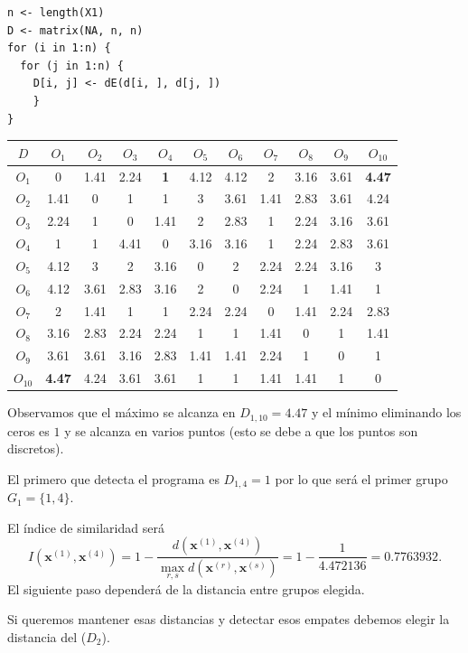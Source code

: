 \begin{lstlisting}
n <- length(X1)
D <- matrix(NA, n, n)
for (i in 1:n) {
  for (j in 1:n) {
    D[i, j] <- dE(d[i, ], d[j, ])
    } 
}
\end{lstlisting}
\begin{center}
\begin{tabular}{c|cccccccccc}
$D$ & $O_{1}$ & $O_2$ & $O_3$ & $O_4$ & $O_5$ & $O_6$ & $O_7$ & $O_8$ & $O_9$ & $O_{10}$ \\ \hline
$O_1$ & 0 & 1.41 & 2.24 & \textbf{1} & 4.12 & 4.12 & 2 & 3.16 & 3.61 & \textbf{4.47} \\
$O_2$ & 1.41 & 0 & 1 & 1 & 3 & 3.61 & 1.41 & 2.83 & 3.61 & 4.24 \\
$O_3$ & 2.24 & 1 & 0 & 1.41 & 2 & 2.83 & 1 & 2.24 & 3.16 & 3.61 \\
$O_4$ & 1 & 1 & 4.41 & 0 & 3.16 & 3.16 & 1 & 2.24 & 2.83 & 3.61 \\
$O_5$ & 4.12 & 3 & 2 & 3.16 & 0 & 2 & 2.24 & 2.24 & 3.16 & 3 \\
$O_6$ & 4.12 & 3.61 & 2.83 & 3.16 & 2 & 0 & 2.24 & 1 & 1.41 & 1 \\
$O_7$ & 2 & 1.41 & 1 & 1 & 2.24 & 2.24 & 0 & 1.41 & 2.24 & 2.83 \\
$O_8$ & 3.16 & 2.83 & 2.24 & 2.24 & 1 & 1 & 1.41 & 0 & 1 & 1.41 \\
$O_9$ & 3.61 & 3.61 & 3.16 & 2.83 & 1.41 & 1.41 & 2.24 & 1 & 0 & 1 \\
$O_{10}$ & \textbf{4.47} & 4.24 & 3.61 & 3.61 & 1 & 1 & 1.41 & 1.41 & 1 & 0 \\
\hline
\end{tabular}
\end{center}

Observamos que el máximo se alcanza en $D_{1,10}=4.47$ y el mínimo eliminando los ceros es $1$ y se alcanza en varios puntos (esto se debe a que los puntos son discretos).

El primero que detecta el programa es $D_{1,4}=1$ por lo que será el primer grupo $G_1=\{1,4\}$.

El índice de similaridad será \[ I(\mathbf{x}^{(1)}, \mathbf{x}^{(4)})=1-\dfrac{d(\mathbf{x}^{(1)},\mathbf{x}^{(4)})}{\displaystyle\max_{r,s} d(\mathbf{x}^{(r)},\mathbf{x}^{(s)})}=1-\dfrac{1}{4.472136}=0.7763932. \]
El siguiente paso dependerá de la distancia entre grupos elegida.

Si queremos mantener esas distancias y detectar esos empates debemos elegir la distancia del  ($D_2$).

